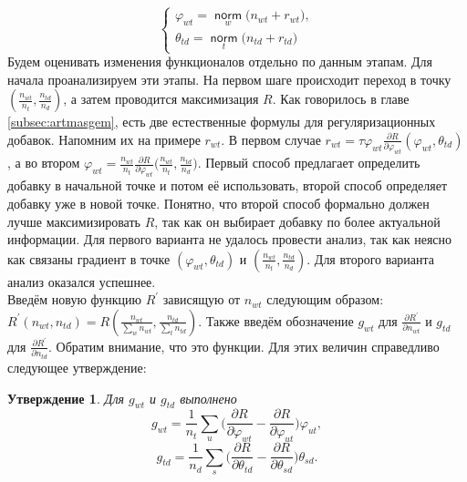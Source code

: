 \documentclass[12pt]{article}
\newtheorem{claim}[remark]{Утверждение}
\renewcommand{\phi}{\varphi}
\newcommand{\norm}{\mathop{\mathsf{norm}}\limits}
\begin{document}
\[
\left\{
\begin{aligned}
 \phi_{wt}  = \norm_w \bigl(n_{wt} + r_{wt} \bigr),\\
\theta_{td} = \norm_t  \bigl(n_{td} + r_{td}\bigr)
\end{aligned}
\right.
\]
Будем оценивать изменения функционалов отдельно по данным этапам. Для начала проанализируем эти этапы. На первом шаге происходит переход в точку $\left(\frac{n_{wt}}{n_t}, \frac{n_{td}}{n_d}\right)$, а затем проводится максимизация $R$. Как говорилось в главе \ref{subsec:artmasgem}, есть две естественные формулы для регуляризационных добавок. Напомним их на примере $r_{wt}$. В первом случае $r_{wt} = \tau\phi_{wt} \frac{\partial{R}}{\partial{\phi_{wt}}} \left( \phi_{wt}, \theta_{td}\right)$, а во втором $\phi_{wt} = \frac{n_{wt}}{n_t} \frac{\partial{R}}{\partial{\phi_{wt}}} \big(\frac{n_{wt}}{n_t}, \frac{n_{td}}{n_d}\big)$. Первый способ предлагает определить добавку в начальной точке и потом её использовать, второй способ определяет добавку уже в новой точке. Понятно, что второй способ формально должен лучше максимизировать $R$, так как он выбирает добавку по более актуальной информации. Для первого варианта не удалось провести анализ, так как неясно как связаны градиент в точке $(\phi_{wt}, \theta_{td})$ и $\left(\frac{n_{wt}}{n_t}, \frac{n_{td}}{n_d}\right)$. Для второго варианта анализ оказался успешнее.\\
Введём новую функцию $R^{\prime}$ зависящую от $n_{wt}$ следующим образом: $R^{\prime}(n_{wt}, n_{td}) = R\left( \frac{n_{wt}}{\sum\limits_w n_{wt}},  \frac{n_{td}}{\sum\limits_t n_{td}}\right)$. Также введём обозначение $g_{wt}$ для $\frac{\partial{R^{\prime}}}{\partial{n_{wt}}}$ и $g_{td}$ для $\frac{\partial{R^{\prime}}}{\partial{n_{td}}}$. Обратим внимание, что это функции. Для этих величин справедливо следующее утверждение:
\begin{claim}
\label{claimgradientvalue}           
Для $g_{wt}$ и $g_{td}$ выполнено
\[
g_{wt} = \frac{1}{n_t} \sum_{u} \bigg(\frac{\partial{R}}{\partial{\phi_{wt}}}  -  \frac{\partial{R}}{\partial{\phi_{ut}}} \bigg)  \phi_{ut} ,
\]
\[
g_{td} = \frac{1}{n_d} \sum_{s} \bigg(\frac{\partial{R}}{\partial{\theta_{td}}}  -  \frac{\partial{R}}{\partial{\theta_{sd}}} \bigg)  \theta_{sd} .
\]
\end{claim}
\end{document}
